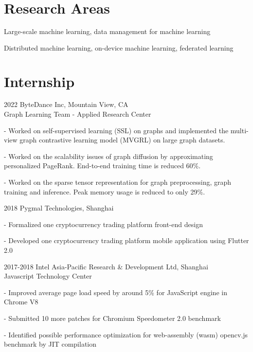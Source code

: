 \documentclass[12pt,letterpaper]{report}
\newcommand{\listitemspace}{0.05em}
\renewenvironment{itemize}
{\begin{list}{}{\setlength{\leftmargin}{0em}
			\setlength{\parskip}{0em}
			\setlength{\itemsep}{\listitemspace}
			\setlength{\parsep}{\listitemspace}}}
	{\end{list}}
\begin{document}
	\section*{Research Areas}

    \begin{itemize}
        \item Large-scale machine learning, data management for machine learning
		\item Distributed machine learning, on-device machine learning, federated learning
    \end{itemize}

	\section*{Internship}
	
	\begin{tablist}
		\item[2022] \tab ByteDance Inc, Mountain View, CA \\
		Graph Learning Team - Applied Research Center\\
		\begin{itemize}
			\item - Worked on self-supervised learning (SSL) on graphs and implemented the multi-view graph contrastive learning model (MVGRL) on large graph datasets. 
			\item - Worked on the scalability issues of graph diffusion by approximating personalized PageRank. End-to-end training time is reduced 60\%.
			\item - Worked on the sparse tensor representation for graph preprocessing, graph training and inference. Peak memory usage is reduced to only 29\%.
		\end{itemize}
		\item[2018] \tab Pygmal Technologies, Shanghai \\
		\begin{itemize}
			\item - Formalized one cryptocurrency trading platform front-end design 
			\item - Developed one cryptocurrency trading platform mobile application using Flutter 2.0
		\end{itemize}
		\item[2017-2018] \tab Intel Asia-Pacific Research \& Development Ltd, Shanghai \\
		Javascript Technology Center\\
		\begin{itemize}
			\item - Improved average page load speed by around 5\% for JavaScript engine in Chrome V8
			\item - Submitted 10 more patches for Chromium Speedometer 2.0 benchmark
			\item - Identified possible performance optimization for web-assembly (wasm) opencv.js benchmark by JIT compilation
		\end{itemize}
	\end{tablist}
\end{document}
